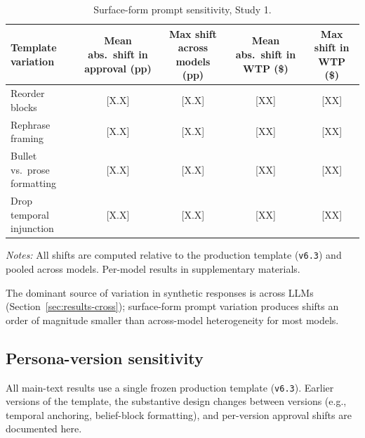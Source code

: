 \documentclass[12pt]{article}
\begin{document}
\begin{table}[h]
    \centering
    \caption{Surface-form prompt sensitivity, Study 1.}
    \label{tab:prompt-sensitivity}
    \begin{threeparttable}
    \begin{tabular}{lcccc}
        \toprule
        Template variation & Mean abs.\ shift in approval (pp) & Max shift across models (pp) & Mean abs.\ shift in WTP (\$) & Max shift in WTP (\$) \\
        \midrule
        Reorder blocks                  & [X.X] & [X.X] & [XX] & [XX] \\
        Rephrase framing                & [X.X] & [X.X] & [XX] & [XX] \\
        Bullet vs.\ prose formatting    & [X.X] & [X.X] & [XX] & [XX] \\
        Drop temporal injunction        & [X.X] & [X.X] & [XX] & [XX] \\
        \bottomrule
    \end{tabular}
    \begin{tablenotes}\footnotesize
        \item \textit{Notes:} All shifts are computed relative to the production template (\texttt{v6.3}) and pooled across models. Per-model results in supplementary materials.
    \end{tablenotes}
    \end{threeparttable}
\end{table}

The dominant source of variation in synthetic responses is across LLMs (Section~\ref{sec:results-cross}); surface-form prompt variation produces shifts an order of magnitude smaller than across-model heterogeneity for most models.

\subsection{Persona-version sensitivity}

All main-text results use a single frozen production template (\texttt{v6.3}). Earlier versions of the template, the substantive design changes between versions (e.g., temporal anchoring, belief-block formatting), and per-version approval shifts are documented here.
\end{document}
